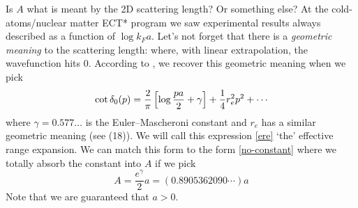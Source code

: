 Is $A$ what is meant by the 2D scattering length?  Or something else?
At the cold-atoms/nuclear matter ECT* program we saw experimental results always described as a function of $\log k_F a$.
Let's not forget that there is a \emph{geometric meaning} to the scattering length: where, with linear extrapolation, the wavefunction hits $0$.
According to , we recover this geometric meaning when we pick
\begin{align}
	\cot \delta_0(p) = \frac{2}{\pi}\left[\log \frac{pa}{2} + \gamma\right] + \frac{1}{4} r_e^2 p^2 + \cdots
	\label{eq:ere}
\end{align}
where $\gamma = 0.577\ldots$ is the Euler–Mascheroni constant and $r_e$ has a similar geometric meaning (see  (18)).
We will call this expression \eqref{ere} `the' effective range expansion.
We can match this form to the form \eqref{no-constant} where we totally absorb the constant into $A$ if we pick
\begin{equation}
	A = \frac{e^{\gamma}}{2} a = (0.8905362090\cdots) a
\end{equation}
Note that we are guaranteed that $a>0$.

